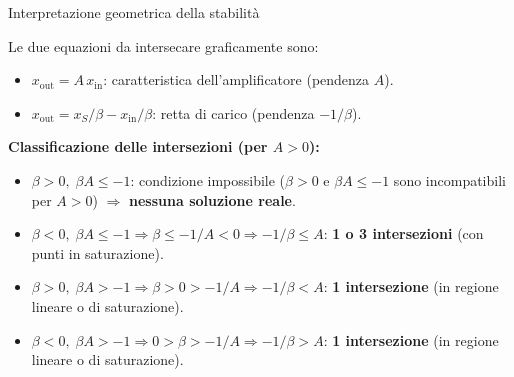 \begin{osservazione}{Interpretazione geometrica della stabilità}
{\centering
    \par}

\medskip
Le due equazioni da intersecare graficamente sono:
\begin{itemize}[noitemsep, leftmargin=*]
    \item $x_{\mathrm{out}} = A\,x_{\mathrm{in}}$: caratteristica dell'amplificatore (pendenza $A$).
    \item $x_{\mathrm{out}} = x_S/\beta - x_{\mathrm{in}}/\beta$: retta di carico (pendenza $-1/\beta$).
\end{itemize}

\medskip
\textbf{Classificazione delle intersezioni (per $A>0$):}
\begin{itemize}[noitemsep, leftmargin=*]
    \item $\beta > 0,\; \beta A \le -1$: condizione impossibile ($\beta > 0$ e $\beta A \le -1$ sono incompatibili per $A > 0$) $\Rightarrow$ \textbf{nessuna soluzione reale}.
    \item $\beta < 0,\; \beta A \le -1 \Rightarrow \beta \le -1/A < 0 \Rightarrow -1/\beta \le A$: \textbf{1 o 3 intersezioni} (con punti in saturazione).
    \item $\beta > 0,\; \beta A > -1 \Rightarrow \beta > 0 > -1/A \Rightarrow -1/\beta < A$: \textbf{1 intersezione} (in regione lineare o di saturazione).
    \item $\beta < 0,\; \beta A > -1 \Rightarrow 0 > \beta > -1/A \Rightarrow -1/\beta > A$: \textbf{1 intersezione} (in regione lineare o di saturazione).
\end{itemize}


\end{osservazione}
